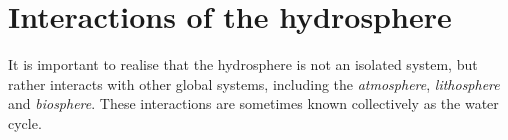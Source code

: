       \label{m38138*id8754}
	\par
    \section{Interactions of the hydrosphere}
            \nopagebreak
      \label{m38138*id334443}It is important to realise that the hydrosphere is not an isolated system, but rather interacts with other global systems, including the \textsl{atmosphere}, \textsl{lithosphere} and \textsl{biosphere}. These interactions are sometimes known collectively as the water cycle.\par 
{}
